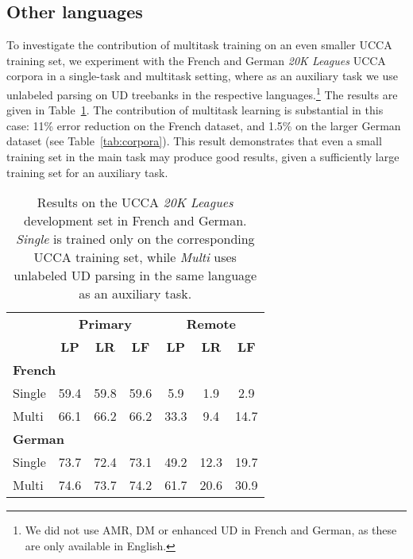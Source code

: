 \documentclass[11pt,a4paper]{article}
\begin{document}
\subsection{Other languages}\label{sec:multilingual}

To investigate the contribution of multitask training on an even smaller UCCA training set,
we experiment with the French and German \textit{20K Leagues} UCCA corpora
\cite{sulem2015conceptual}
in a single-task and multitask setting, where as an auxiliary task we use unlabeled parsing on
UD treebanks in the respective languages.\footnote{We did not use AMR, DM or enhanced UD in French
and German, as these are only available in English.}
The results are given in Table~\ref{tab:multilingual}.
The contribution of multitask learning is substantial in this case:
11\% error reduction on the French dataset, and 1.5\% on the larger German dataset
(see Table~\ref{tab:corpora}).
This result demonstrates that even a small training set in the main task may produce good results,
given a sufficiently large training set for an auxiliary task.

\begin{table}
\begin{tabular}{l|ccc|ccc}
& \multicolumn{3}{c|}{\footnotesize \bf Primary} & \multicolumn{3}{c}{\footnotesize \bf Remote} \\
& \footnotesize \textbf{LP} & \footnotesize \textbf{LR} & \footnotesize \textbf{LF}
& \footnotesize \textbf{LP} & \footnotesize \textbf{LR} & \footnotesize \textbf{LF} \\
\hline
\multicolumn{4}{l|}{\small \bf French} & \\
\small Single & 59.4 & 59.8 & 59.6 & 5.9 & 1.9 & 2.9 \\
\small Multi & 66.1 & 66.2 & 66.2 & 33.3 & 9.4 & 14.7 \\
\hline
\multicolumn{4}{l|}{\small \bf German} & \\
\small Single & 73.7 & 72.4 & 73.1 & 49.2 & 12.3 & 19.7 \\
\small Multi & 74.6 & 73.7 & 74.2 & 61.7 & 20.6 & 30.9
\end{tabular}
\caption{Results on the UCCA \textit{20K Leagues}
development set in French and German.
\textit{Single} is trained only on the corresponding UCCA training set,
while \textit{Multi} uses unlabeled UD parsing in the same language as an auxiliary task.
\label{tab:multilingual}}
\end{table}
\end{document}
